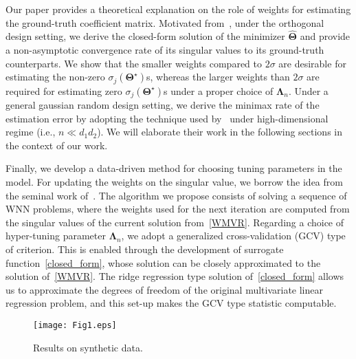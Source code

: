 \documentclass[12pt]{article}
\begin{document}
Our paper provides a theoretical explanation on the role of weights for estimating the ground-truth coefficient matrix.
Motivated from~\citet{yuan2007dimension}, under the orthogonal design setting, we derive the closed-form solution of the minimizer $\widehat{\boldsymbol{\Theta}}$ and provide a non-asymptotic convergence rate of its singular values to its ground-truth counterparts. 
We show that the smaller weights compared to $2\sigma$ are desirable for estimating the non-zero $\sigma_{j}(\boldsymbol{\Theta}^{\star})$s, whereas the larger weights than $2\sigma$ are required for estimating zero $\sigma_{j}(\boldsymbol{\Theta}^{\star})$s under a proper choice of $\boldsymbol{\Lambda}_{n}$.
Under a general gaussian random design setting, we derive the minimax rate of the estimation error by adopting the technique used by~\citet{negahban2011estimation} under high-dimensional regime (i.e., $n \ll d_{1}d_{2}$).
We will elaborate their work in the following sections in the context of our work.

Finally, we develop a data-driven method for choosing tuning parameters in the model.
For updating the weights on the singular value, we borrow the idea from the seminal work of~\citet{candes2008enhancing}.
The algorithm we propose consists of solving a sequence of WNN problems, where the weights used for the next iteration are computed from the singular values of the current solution from~\eqref{WMVR}.
Regarding a choice of hyper-tuning parameter $\boldsymbol{\Lambda}_{n}$, we adopt a generalized cross-validation (GCV) type of criterion.
This is enabled through the development of surrogate function~\eqref{closed_form}, whose solution can be closely approximated to the solution of~\eqref{WMVR}.
The ridge regression type solution of~\eqref{closed_form} allows us to approximate the degrees of freedom of the original multivariate linear regression problem, 
and this set-up makes the GCV type statistic computable.

\begin{figure}
  \hspace*{-1.4cm}                                                           
  \texttt{[image: Fig1.eps]}
  \centering
  \caption{Results on synthetic data.} 
  \label{Fig1}
\end{figure}
\end{document}
